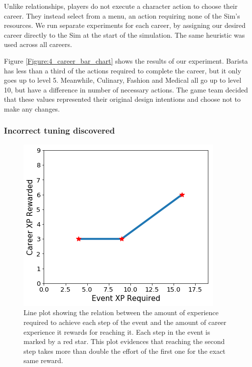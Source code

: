 \documentclass[letterpaper]{article} %
\begin{document}
Unlike relationships, players do not execute a character action to choose their career. They instead select from a menu, an action requiring none of the Sim's resources. We run separate experiments for each career, by assigning our desired career directly to the Sim at the start of the simulation. The same heuristic was used across all careers.

Figure \ref{Figure:4_career_bar_chart} shows the results of our experiment. Barista has less than a third of the actions required to complete the career, but it only goes up to level 5. Meanwhile, Culinary, Fashion and Medical all go up to level 10, but have a difference in number of necessary actions. The game team decided that these values represented their original design intentions and choose not to make any changes.

\subsubsection{Incorrect tuning discovered}

\begin{figure}[th]
\centering
\includegraphics[height=0.75\linewidth,width=1.0\linewidth]{images/Career_Star_XP_relation.png}
\caption{Line plot showing the relation between the amount of experience required to achieve each step of the event and the amount of career experience it rewards for reaching it. Each step in the event is marked by a red star. This plot evidences that reaching the second step takes more than double the effort of the first one for the exact same reward.}
\label{Figure:career_event_star_incorrect_tuning}
\end{figure}
\end{document}
